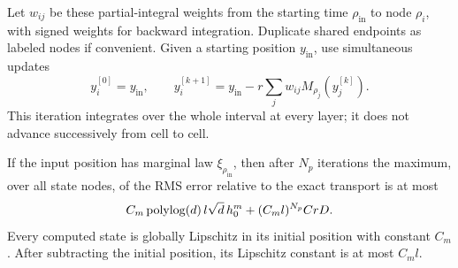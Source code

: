Let $w_{ij}$ be these partial-integral weights from the starting time
$\rho_{\mathrm{in}}$ to node $\rho_i$, with signed weights for backward
integration.  Duplicate shared endpoints as labeled nodes if convenient.
Given a starting position $y_{\mathrm{in}}$, use simultaneous updates
\begin{equation}\label{eq:probability-update}
 y_i^{[0]}=y_{\mathrm{in}},\qquad
 y_i^{[k+1]}=y_{\mathrm{in}}-
 r\sum_j w_{ij}M_{\rho_j}(y_j^{[k]}).
\end{equation}
This iteration integrates over the whole interval at every layer; it does
not advance successively from cell to cell.

\begin{proposition}
\label{prop:probability-circuit}
If the input position has marginal law $\xi_{\rho_{\mathrm{in}}}$, then
after $N_p$ iterations the maximum, over all state nodes, of the RMS
error relative to the exact transport is at most
\begin{equation}\label{eq:probability-picard}
 C_m\operatorname{polylog}(d)\,l\sqrt d\,h_0^m
       +(C_ml)^{N_p}CrD.
\end{equation}
Every computed state is globally Lipschitz in its initial position with
constant $C_m$.  After subtracting the initial position, its Lipschitz
constant is at most $C_ml$.
\end{proposition}

